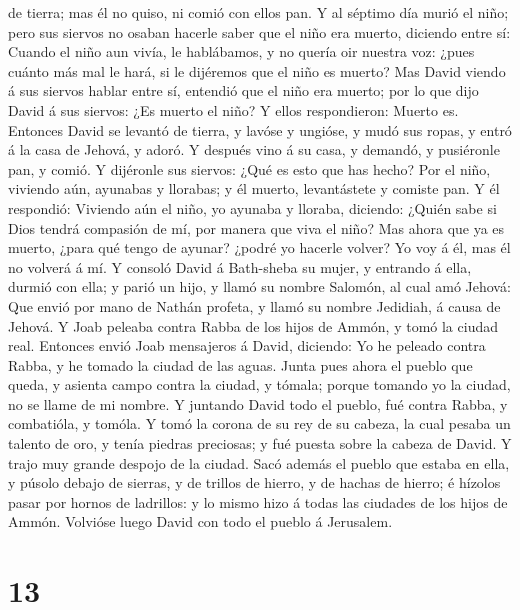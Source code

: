 de tierra; mas él no quiso, ni comió con ellos pan.  Y al
séptimo día murió el niño; pero sus siervos no osaban hacerle saber que
el niño era muerto, diciendo entre sí: Cuando el niño aun vivía, le
hablábamos, y no quería oir nuestra voz: ¿pues cuánto más mal le hará,
si le dijéremos que el niño es muerto?  Mas David viendo
á sus siervos hablar entre sí, entendió que el niño era muerto; por lo
que dijo David á sus siervos: ¿Es muerto el niño? Y ellos respondieron:
Muerto es.  Entonces David se levantó de tierra, y lavóse
y ungióse, y mudó sus ropas, y entró á la casa de Jehová, y adoró. Y
después vino á su casa, y demandó, y pusiéronle pan, y comió.
 Y dijéronle sus siervos: ¿Qué es esto que has hecho? Por
el niño, viviendo aún, ayunabas y llorabas; y él muerto, levantástete y
comiste pan.  Y él respondió: Viviendo aún el niño, yo
ayunaba y lloraba, diciendo: ¿Quién sabe si Dios tendrá compasión de mí,
por manera que viva el niño?  Mas ahora que ya es muerto,
¿para qué tengo de ayunar? ¿podré yo hacerle volver? Yo voy á él, mas él
no volverá á mí.  Y consoló David á Bath-sheba su mujer,
y entrando á ella, durmió con ella; y parió un hijo, y llamó su nombre
Salomón, al cual amó Jehová:  Que envió por mano de
Nathán profeta, y llamó su nombre Jedidiah, á causa de Jehová.
 Y Joab peleaba contra Rabba de los hijos de Ammón, y
tomó la ciudad real.  Entonces envió Joab mensajeros á
David, diciendo: Yo he peleado contra Rabba, y he tomado la ciudad de
las aguas.  Junta pues ahora el pueblo que queda, y
asienta campo contra la ciudad, y tómala; porque tomando yo la ciudad,
no se llame de mi nombre.  Y juntando David todo el
pueblo, fué contra Rabba, y combatióla, y tomóla.  Y tomó
la corona de su rey de su cabeza, la cual pesaba un talento de oro, y
tenía piedras preciosas; y fué puesta sobre la cabeza de David. Y trajo
muy grande despojo de la ciudad.  Sacó además el pueblo
que estaba en ella, y púsolo debajo de sierras, y de trillos de hierro,
y de hachas de hierro; é hízolos pasar por hornos de ladrillos: y lo
mismo hizo á todas las ciudades de los hijos de Ammón. Volvióse luego
David con todo el pueblo á Jerusalem.

\hypertarget{section-12}{%
\section{13}\label{section-12}}

